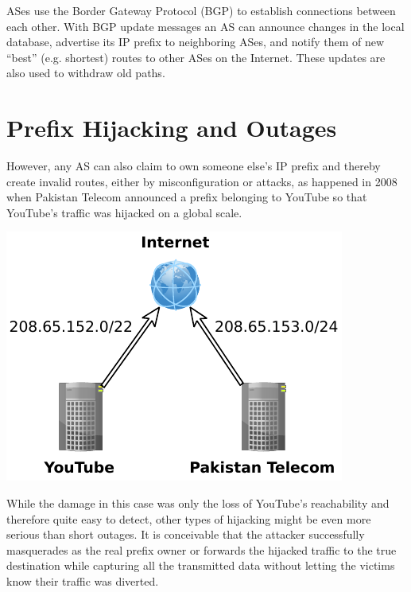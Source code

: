 \documentclass[a0,portrait,posterdraft]{a0poster}
\begin{document}
\begin{mybox}
\begin{multicols}{3}
\noindent ASes use the Border Gateway Protocol (BGP) to establish connections
between each other. With BGP update messages an AS can announce changes in the
local database, advertise its IP prefix to neighboring ASes, and notify them of
new ``best'' (e.g. shortest) routes to other ASes on the Internet. These updates
are also used to withdraw old paths.

\section*{Prefix Hijacking and Outages}
However, any AS can also claim to own someone else's IP prefix and thereby
create invalid routes, either by misconfiguration or attacks, as happened in
2008 when Pakistan Telecom announced a prefix belonging to YouTube so that
YouTube's traffic was hijacked on a global scale.

\vfill
\columnbreak

\begin{center}\vspace{1cm}
\includegraphics[width=0.9\linewidth,interpolate]{youtube_hijack.pdf}
\end{center}\vspace{1cm}

\noindent While the damage in this case was only the loss of YouTube's
reachability and therefore quite easy to detect, other types of hijacking might
be even more serious than short outages. It is conceivable that the attacker
successfully masquerades as the real prefix owner or forwards the hijacked
traffic to the true destination while capturing all the transmitted data without
letting the victims know their traffic was diverted.


\end{multicols}
\end{mybox}
\end{document}
